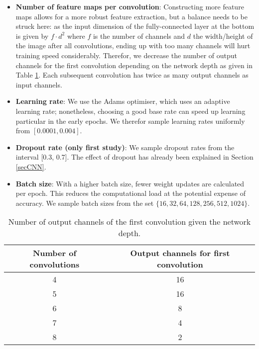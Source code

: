 \documentclass[british,12p]{article}
\begin{document}
\begin{itemize}
    	\item \textbf{Number of feature maps per convolution}: Constructing more feature maps allows for a more robust feature extraction, but a balance needs to be struck here: as the input dimension of the fully-connected layer at the bottom is given by $f \cdot d^2$ where $f$ is the number of channels and $d$ the width/height of the image after all convolutions, ending up with too many channels will hurt training speed considerably. Therefor, we decrease the number of output channels for the first convolution depending on the network depth as given in Table \ref{tab-cout}. Each subsequent convolution has twice as many output channels as input channels. 
    	\item \textbf{Learning rate}: We use the Adams optimiser, which uses an adaptive learning rate; nonetheless, choosing a good base rate can speed up learning particular in the early epochs. We therefor sample learning rates uniformly from $[0.0001, 0.004]$.
    	\item \textbf{Dropout rate (only first study)}: We sample dropout rates from the interval [0.3, 0.7]. The effect of dropout has already been explained in Section \ref{secCNN}.
    	\item \textbf{Batch size}: With a higher batch size, fewer weight updates are calculated per epoch. This reduces the computational load at the potential expense of accuracy. We sample batch sizes from the set $\{16, 32, 64, 128, 256, 512, 1024\}$.

    \end{itemize}
    \begin{table}
    \begin{center}
    \begin{tabular}{c|c}
  		Number of convolutions & Output channels for first convolution  \\
  		\hline\hline
  		4 & 16\\\hline 
  		5 & 16\\\hline 
  		6 & 8\\\hline 
  		7 & 4\\\hline 
  		8 & 2\\\hline 
  		 
	\end{tabular}
	\caption{Number of output channels of the first convolution given the network depth.}
	\label{tab-cout}
	\end{center}
	 \end{table}
    
    
\end{document}
